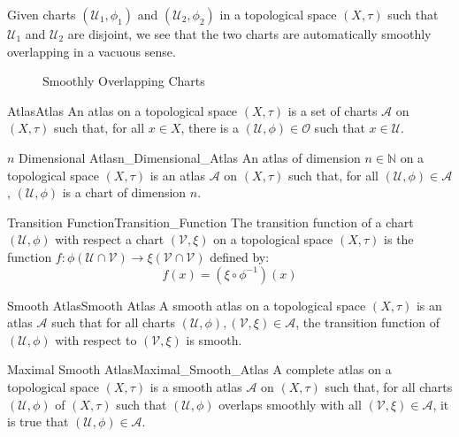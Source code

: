     Given charts $(\mathcal{U}_{1},\phi_{1})$ and
    $(\mathcal{U}_{2},\phi_{2})$ in a topological space $(X,\tau)$ such
    that $\mathcal{U}_{1}$ and $\mathcal{U}_{2}$ are disjoint, we see that
    the two charts are automatically smoothly overlapping in a
    vacuous sense.
    \begin{figure}[H]
        \centering
        \captionsetup{type=figure}
        
        \caption{Smoothly Overlapping Charts}
        \label{fig:Smoothly_Overlapping_Charts}
    \end{figure}
    \begin{fdefinition}{Atlas}{Atlas}
        An atlas on a topological space $(X,\tau)$ is a set of charts
        $\mathcal{A}$ on $(X,\tau)$ such that, for all $x\in{X}$, there
        is a $(\mathcal{U},\phi)\in\mathcal{O}$ such that $x\in\mathcal{U}$.
    \end{fdefinition}
    \begin{ldefinition}{$n$ Dimensional Atlas}{n_Dimensional_Atlas}
        An atlas of dimension $n\in\mathbb{N}$ on a topological space
        $(X,\tau)$ is an atlas $\mathcal{A}$ on $(X,\tau)$ such that, for
        all $(\mathcal{U},\phi)\in\mathcal{A}$, $(\mathcal{U},\phi)$ is
        a chart of dimension $n$.
    \end{ldefinition}
    \begin{fdefinition}{Transition Function}{Transition_Function}
        The transition function of a chart $(\mathcal{U},\phi)$ with
        respect a chart $(\mathcal{V},\xi)$ on a topological space
        $(X,\tau)$ is the function
        $f:\phi(\mathcal{U}\cap\mathcal{V})%
         \rightarrow\xi(\mathcal{V}\cap\mathcal{V})$ defined by:
        \begin{equation}
            f(x)=(\xi\circ\phi^{\minus{1}})(x)
        \end{equation}
    \end{fdefinition}
    \begin{fdefinition}{Smooth Atlas}{Smooth Atlas}
        A smooth atlas on a topological space $(X,\tau)$ is an
        atlas $\mathcal{A}$ such that for all charts
        $(\mathcal{U},\phi),(\mathcal{V},\xi)\in\mathcal{A}$, the
        transition function of $(\mathcal{U},\phi)$ with respect to
        $(\mathcal{V},\xi)$ is smooth.
    \end{fdefinition}
    \begin{fdefinition}{Maximal Smooth Atlas}{Maximal_Smooth_Atlas}
        A complete atlas on a topological space $(X,\tau)$ is a smooth
        atlas $\mathcal{A}$ on $(X,\tau)$ such that, for all charts
        $(\mathcal{U},\phi)$ of $(X,\tau)$ such that $(\mathcal{U},\phi)$
        overlaps smoothly with all $(\mathcal{V},\xi)\in\mathcal{A}$, it
        is true that $(\mathcal{U},\phi)\in\mathcal{A}$.
    \end{fdefinition}
